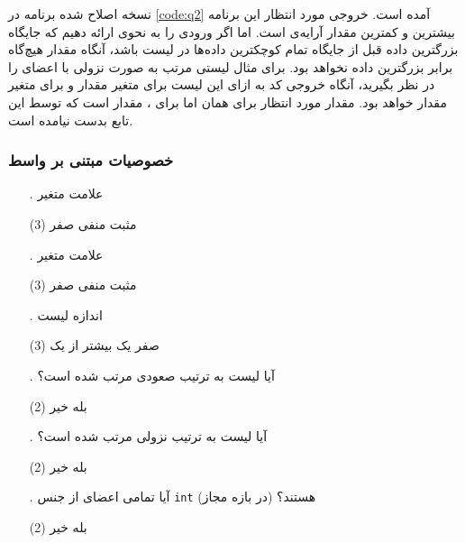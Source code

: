 \documentclass[twoside]{article}
\newenvironment{answer}{}{\medskip}
\begin{document}
\begin{answer}
نسخه اصلاح شده برنامه در \autoref{code:q2} آمده است. خروجی مورد انتظار این برنامه بیشترین و کمترین مقدار آرایه‌ی  است. اما اگر ورودی را به نحوی ارائه دهیم که جایگاه بزرگترین داده قبل از جایگاه تمام کوچکترین داده‌ها در لیست باشد، آنگاه مقدار  هیچ‌گاه برابر بزرگترین داده نخواهد بود.
برای مثال لیستی مرتب به صورت نزولی با اعضای \code{\lr{[4, 3, 2, 1]}}
را در نظر بگیرید، آنگاه خروجی کد به ازای این لیست برای متغیر  مقدار  و برای متغیر  مقدار  خواهد بود.
مقدار مورد انتظار برای  همان  اما برای ، مقدار  است که توسط این تابع بدست نیامده است.

\subsubsection*{خصوصیات مبتنی بر واسط}
\begin{enumerate}
	\item[\lr{\textbf{A}}.]
علامت متغیر 
	\begin{tasks}(3)
		\task[\lr{1}. ] مثبت
		\task[\lr{2}. ] منفی
		\task[\lr{3}. ] صفر
	\end{tasks}
	\item[\lr{\textbf{B}}.]
علامت متغیر 
	\begin{tasks}(3)
		\task[\lr{1}. ] مثبت
		\task[\lr{2}. ] منفی
		\task[\lr{3}. ] صفر
	\end{tasks}
	\item[\lr{\textbf{C}}.]
اندازه لیست 
	\begin{tasks}(3)
		\task[\lr{1}. ] صفر
		\task[\lr{2}. ] یک 
		\task[\lr{3}. ] بیشتر از یک
	\end{tasks}
	\item[\lr{\textbf{D}}.]
آیا لیست  به ترتیب صعودی مرتب شده است؟
	\begin{tasks}(2)
		\task[\lr{1}. ] بله
		\task[\lr{2}. ] خیر 
	\end{tasks}
	\item[\lr{\textbf{E}}.]
آیا لیست  به ترتیب نزولی مرتب شده است؟
	\begin{tasks}(2)
		\task[\lr{1}. ] بله
		\task[\lr{2}. ] خیر 
	\end{tasks}
	\item[\lr{\textbf{F}}.]
آیا تمامی اعضای  از جنس  \texttt{int} (در بازه مجاز) هستند؟
	\begin{tasks}(2)
		\task[\lr{1}. ] بله
		\task[\lr{2}. ] خیر

\end{tasks}
\end{enumerate}
\end{answer}
\end{document}
